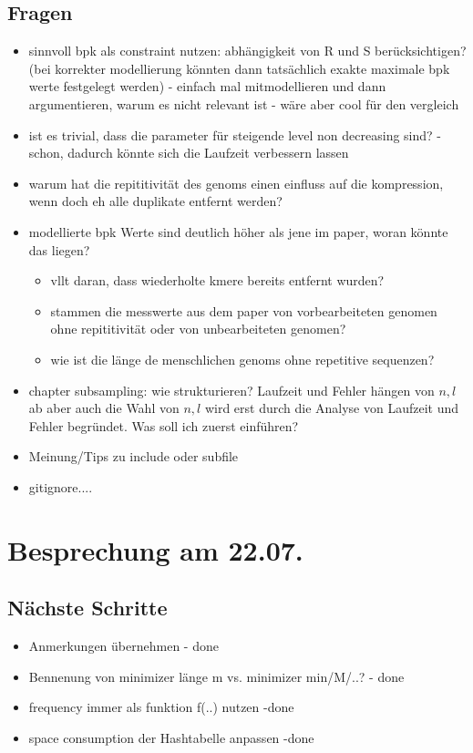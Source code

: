 \documentclass{article}
\begin{document}
	\subsection*{Fragen}
	\begin{itemize}
			\item sinnvoll bpk als constraint nutzen: abhängigkeit von R und S berücksichtigen? (bei korrekter modellierung könnten dann tatsächlich exakte maximale bpk werte festgelegt werden) - einfach mal mitmodellieren und dann argumentieren, warum es nicht relevant ist - wäre aber cool für den vergleich
			\item ist es trivial, dass die parameter für steigende level non decreasing sind? - schon, dadurch könnte sich die Laufzeit verbessern lassen
			\item warum hat die repititivität des genoms einen einfluss auf die kompression, wenn doch eh alle duplikate entfernt werden?
			\item modellierte bpk Werte sind deutlich höher als jene im paper, woran könnte das liegen? 
			\begin{itemize}
				\item vllt daran, dass wiederholte kmere bereits entfernt wurden?
				\item stammen die messwerte aus dem paper von vorbearbeiteten genomen ohne repititivität oder von unbearbeiteten genomen?
				\item wie ist die länge de menschlichen genoms ohne repetitive sequenzen?
			\end{itemize}
			\item chapter subsampling: wie strukturieren? Laufzeit und Fehler hängen von $n,l$ ab aber auch die Wahl von $n,l$ wird erst durch die Analyse von Laufzeit und Fehler begründet. Was soll ich zuerst einführen?
			\item Meinung/Tips zu include oder subfile
			\item gitignore....
		\end{itemize}
	
\section*{Besprechung am 22.07.}
\subsection*{Nächste Schritte}
	\begin{itemize}
			\item Anmerkungen übernehmen - done
			\item Bennenung von minimizer länge m vs. minimizer min/M/..? - done
			\item frequency immer als funktion f(..) nutzen -done
			\item space consumption der Hashtabelle anpassen -done
		\end{itemize}
\end{document}
